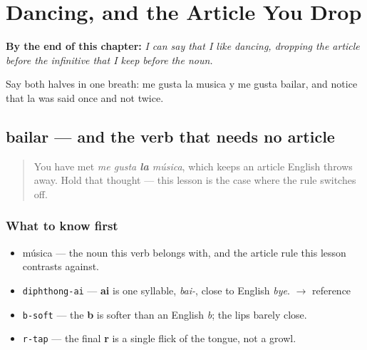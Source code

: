 
\chapter{Dancing, and the Article You Drop}
\label{ch:bailar}

\begin{chapteropening}
\textbf{By the end of this chapter:} \emph{I can say that I like dancing, dropping the article before the infinitive that I keep before the noun.}

Say both halves in one breath: me gusta la musica y me gusta bailar, and notice that la was said once and not twice.
\end{chapteropening}

\section[bailar]{bailar — and the verb that needs no article}

\label{lesson:ES-C419-bailar}



\begin{quote}
You have met \emph{me gusta \textbf{la} música}, which keeps an article English throws away. Hold that thought — this lesson is the case where the rule switches off.
\end{quote}

\subsection*{What to know first}
\begin{itemize}
\raggedright
  \item música — the noun this verb belongs with, and the article rule this lesson contrasts against.
\end{itemize}

\begin{sounds}
\begin{itemize}
\raggedright
  \item \texttt{diphthong-ai} — \textbf{ai} is one syllable, \emph{bai-}, close to English \emph{bye}. $\to$ reference
  \item \texttt{b-soft} — the \textbf{b} is softer than an English \emph{b}; the lips barely close.
  \item \texttt{r-tap} — the final \textbf{r} is a single flick of the tongue, not a growl.
\end{itemize}
\end{sounds}


